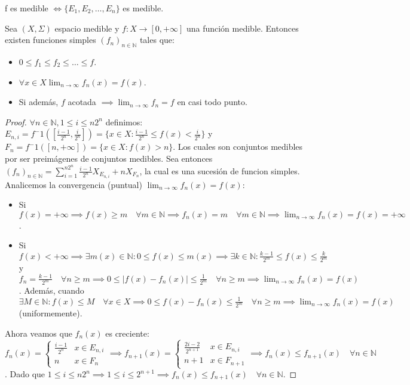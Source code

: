 \begin{observación}
    f es medible $\iff \{E_1, E_2, \dots, E_n\}$ es medible.
\end{observación}
\begin{teorema}
    Sea $(X, \Sigma)$ espacio medible y $f: X \to [0, +\infty]$ una función medible. Entonces existen funciones simples $(f_n)_{n \in \mathbb{N}}$ tales que:
    \begin{itemize}
        \item $0 \leq f_1 \leq f_2 \leq \dots \leq f$.
        \item $\forall x \in X \lim_{n \to \infty}f_n(x) = f(x)$.
        \item Si además, $f$ acotada $\implies \lim_{n \to \infty}f_n = f$ en casi todo punto.
    \end{itemize} 
\end{teorema}
\begin{proof}
    $\forall n \in \mathbb{N}, 1 \leq i \leq n2^n$ definimos: 
    $E_{n, i} = f^-1([\frac{i-1}{2^n}, \frac{i}{2^n}]) = \{x \in X : \frac{i-1}{2^n} \leq f(x) < \frac{i}{2^n}\}$ y $F_n = f^-1([n, +\infty]) = \{x \in X : f(x) > n\}$.
    Los cuales son conjuntos medibles por ser preimágenes de conjuntos medibles. Sea entonces $(f_n)_{n\in\mathbb{N}} = \sum_{i = 1}^{n2^n}\frac{i-1}{2^n}X_{E_{n, i}} + nX_{F_n}$, la cual es una sucesión de funcion simples. 
    Analicemos la convergencia (puntual) $\lim_{n \to \infty}f_n(x) = f(x)$: 
    \begin{itemize}
        \item Si $f(x) = +\infty \implies f(x) \geq m \quad \forall m \in \mathbb{N} \implies f_n(x) = m \quad \forall m \in \mathbb{N} \implies \lim_{n \to \infty}f_n(x) = f(x) = +\infty$.
        \item Si $f(x) < +\infty \implies \exists m(x) \in \mathbb{N} : 0 \leq f(x) \leq m(x) \implies \exists k \in \mathbb{N} : \frac{k-1}{2^m} \leq f(x) \leq \frac{k}{2^m}$ y $f_n = \frac{k-1}{2^m} \quad \forall n \geq m \implies 0 \leq |f(x) - f_n(x)| \leq \frac{1}{2^m} \quad \forall n \geq m \implies \lim_{n \to \infty}f_n(x) = f(x)$. Además, cuando $\exists M \in \mathbb{N} : f(x) \leq M \quad \forall x \in X \implies 0 \leq f(x) - f_n(x) \leq \frac{1}{2^m} \quad \forall n \geq m \implies \lim_{n \to \infty}f_n(x) = f(x)$ (uniformemente).
    \end{itemize}
    Ahora veamos que $f_n(x)$ es creciente:
    $f_n(x) = \begin{cases}
        \frac{i-1}{2^n} & x \in E_{n, i} \\
        n & x \in F_n
    \end{cases}
    \implies f_{n+1}(x) = \begin{cases}
        \frac{2i-2}{2^{n+1}} & x \in E_{n, i} \\
        n+1 & x \in F_{n+1}
    \end{cases}
    \implies f_n(x) \leq f_{n+1}(x) \quad \forall n \in \mathbb{N}$. Dado que $1 \leq i \leq n2^n \implies 1 \leq i \leq 2^{n+1} \implies f_n(x) \leq f_{n+1}(x) \quad \forall n \in \mathbb{N}$.
\end{proof} 

